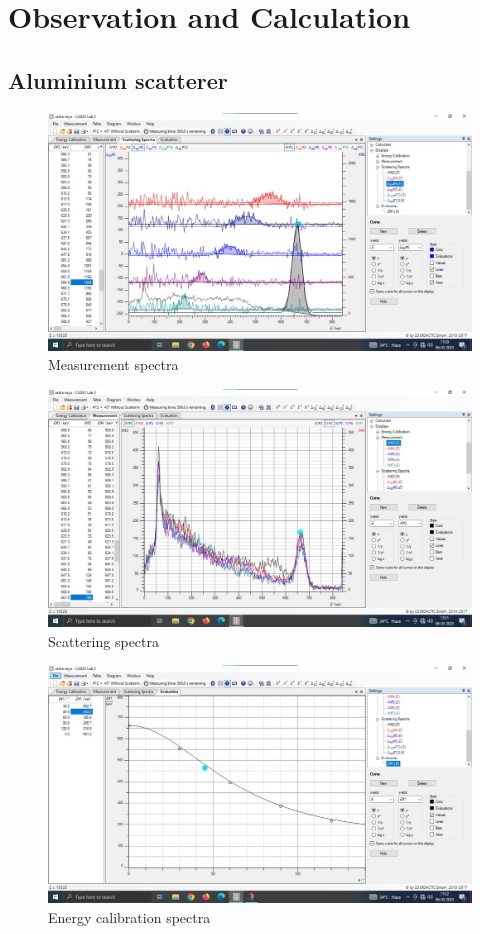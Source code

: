\section{Observation and Calculation}
	\subsection{Aluminium scatterer}
		\begin{figure}[H]
			\centering
			\includegraphics[width=0.8\columnwidth]{images/o_1.png}
			\caption{Measurement spectra}
			\label{graph:1}
		\end{figure}
		\begin{figure}[H]
			\centering
			\includegraphics[width=0.8\columnwidth]{images/o_3.png}
			\caption{Scattering spectra}
			\label{graph:2}
		\end{figure}
		\begin{figure}[H]
			\centering
			\includegraphics[width=0.8\columnwidth]{images/o_4.png}
			\caption{Energy calibration spectra}
			\label{graph:3}
		\end{figure}

